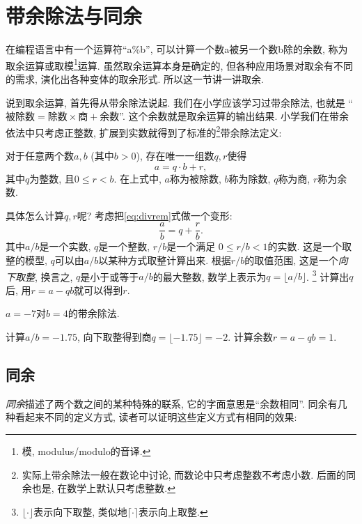 \section{带余除法与同余} \label{sec:modulo}

在编程语言中有一个运算符``a\%b'',
可以计算一个数a被另一个数b除的余数,
称为取余运算或取模\footnote{模, modulus/modulo的音译.}运算.
虽然取余运算本身是确定的, 但各种应用场景对取余有不同的需求,
演化出各种变体的取余形式.
所以这一节讲一讲取余.

说到取余运算, 首先得从带余除法说起.
我们在小学应该学习过带余除法, 也就是
``$被除数 = 除数 \times 商 + 余数$''.
这个余数就是取余运算的输出结果.
小学我们在带余依法中只考虑正整数,
扩展到实数就得到了标准的\footnote{
  实际上带余除法一般在数论中讨论, 而数论中只考虑整数不考虑小数.
  后面的同余也是, 在数学上默认只考虑整数.
}带余除法定义:

\begin{definition}[带余除法]\label{def:divrem}
  对于任意两个数$a,b$ (其中$b>0$), 存在唯一一组数$q,r$使得
  \begin{equation}\label{eq:divrem}
    a = q \cdot b + r,
  \end{equation}
  其中$q$为整数, 且$0 \le r < b$.
  在上式中, $a$称为被除数, $b$称为除数, $q$称为商, $r$称为余数.
\end{definition}

具体怎么计算$q,r$呢?
考虑把\ref{eq:divrem}式做一个变形:
\[
  \dfrac ab = q + \dfrac rb.
\]
其中$a/b$是一个实数, $q$是一个整数, $r/b$是一个满足
$0 \le r/b < 1$的实数. 这是一个取整的模型,
$q$可以由$a/b$以某种方式取整计算出来.
根据$r/b$的取值范围, 这是一个\emph{向下取整},
换言之, $q$是小于或等于$a/b$的最大整数,
数学上表示为$q=\lfloor{a/b}\rfloor$.
\footnote{
  $\lfloor\cdot\rfloor$表示向下取整,
  类似地$\lceil\cdot\rceil$表示向上取整.
}
计算出$q$后, 用$r=a-qb$就可以得到$r$.

\begin{example}
  $a=-7$对$b=4$的带余除法.

  计算$a/b=-1.75$, 向下取整得到商$q=\lfloor{-1.75}\rfloor=-2$.
  计算余数$r = a-qb = 1$.
\end{example}

\subsection{同余}

\emph{同余}描述了两个数之间的某种特殊的联系,
它的字面意思是``余数相同''.
同余有几种看起来不同的定义方式,
读者可以证明这些定义方式有相同的效果:

